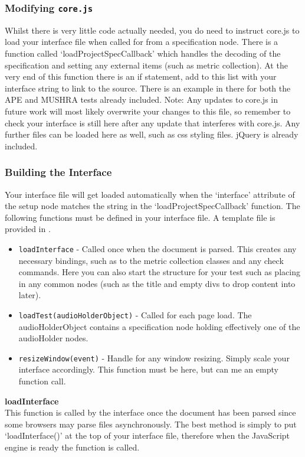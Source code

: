 \documentclass[11pt, oneside]{article}   	%
\begin{document}
		\subsubsection{Modifying \texttt{core.js}}
			Whilst there is very little code actually needed, you do need to instruct core.js to load your interface file when called for from a specification node. There is a function called `loadProjectSpecCallback' which handles the decoding of the specification and setting any external items (such as metric collection). At the very end of this function there is an if statement, add to this list with your interface string to link to the source. There is an example in there for both the APE and MUSHRA tests already included. Note: Any updates to core.js in future work will most likely overwrite your changes to this file, so remember to check your interface is still here after any update that interferes with core.js.
			Any further files can be loaded here as well, such as css styling files. jQuery is already included.

		\subsubsection{Building the Interface}
			Your interface file will get loaded automatically when the `interface' attribute of the setup node matches the string in the `loadProjectSpecCallback' function. The following functions must be defined in your interface file. A template file is provided in .	
			\begin{itemize}
				\item \texttt{loadInterface} - Called once when the document is parsed. This creates any necessary bindings, such as to the metric collection classes and any check commands. Here you can also start the structure for your test such as placing in any common nodes (such as the title and empty divs to drop content into later).
				\item \texttt{loadTest(audioHolderObject)} - Called for each page load. The audioHolderObject contains a specification node holding effectively one of the audioHolder nodes.
				\item \texttt{resizeWindow(event)} - Handle for any window resizing. Simply scale your interface accordingly. This function must be here, but can me an empty function call.
			\end{itemize}

			\textbf{loadInterface}\\
				This function is called by the interface once the document has been parsed since some browsers may parse files asynchronously. The best method is simply to put `loadInterface()' at the top of your interface file, therefore when the JavaScript engine is ready the function is called.
\end{document}
